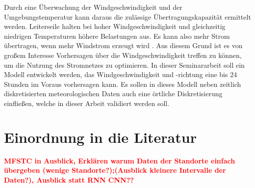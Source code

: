 \documentclass[
12pt, %
toc=listofnumbered, %
toc=chapterentrydotfill, %
numbers=noenddot, %
captions=tableheading, %
bibliography=numbered
]{scrreprt}
\let\Oldsection\section
\renewcommand{\section}{\FloatBarrier\Oldsection}
\newcommand{\highlight}[1]{\textbf{\textcolor{red}{#1}}}
\begin{document}
Durch eine Überwachung der Windgeschwindigkeit und der Umgebungstemperatur kann daraus die zulässige Übertragungskapazität ermittelt werden. 
Leiterseile halten bei hoher Windgeschwindigkeit und gleichzeitig niedrigen Temperaturen höhere Belastungen aus. 
Es kann also mehr Strom übertragen, wenn mehr Windstrom erzeugt wird \cite{2015_Axthelm_BisFaktenZur}. Aus diesem Grund ist es von großem Interesse Vorhersagen über die Windgeschwindigkeit treffen zu können, um 
die Nutzung des Stromnetzes zu optimieren. In dieser Seminararbeit soll ein Modell entwickelt werden, das 
Windgeschwindigkeit und -richtung eine bis 24 Stunden im Voraus vorhersagen kann. Es sollen in dieses Modell neben zeitlich diskretisierten 
meteorologischen Daten auch eine örtliche Diskretisierung einfließen, welche in dieser Arbeit validiert werden soll.

\section{Einordnung in die Literatur}\label{section:literatur}

\highlight{MFSTC in Ausblick, Erklären warum Daten der Standorte einfach übergeben (wenige Standorte?);(Ausblick kleinere Intervalle der Daten?), Ausblick statt RNN CNN??\bigskip}
\end{document}
